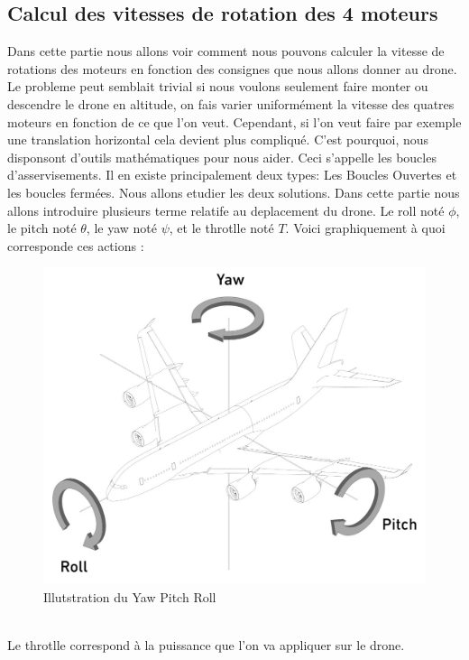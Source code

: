 \documentclass[10pt,a4paper]{article}
\begin{document}
\subsection{Calcul des vitesses de rotation des 4 moteurs}
Dans cette partie nous allons voir comment nous pouvons calculer la vitesse de rotations des moteurs en fonction des consignes que nous allons donner au drone. Le probleme peut semblait trivial si nous voulons seulement faire monter ou descendre le drone en altitude, on fais varier uniformément la vitesse des quatres moteurs en fonction de ce que l'on veut. Cependant, si l'on veut faire par exemple une translation horizontal cela devient plus compliqué. C'est pourquoi, nous disponsont d'outils mathématiques pour nous aider. Ceci s'appelle les boucles d'asservisements. Il en existe principalement deux types: Les Boucles Ouvertes et les boucles fermées. Nous allons etudier les deux solutions.
Dans cette partie nous allons introduire plusieurs terme relatife au deplacement du drone. Le roll noté $\phi$, le pitch noté $\theta$, le yaw noté  $\psi $, et le throtlle noté $T$. Voici graphiquement à quoi corresponde ces actions :
 \begin{figure}[h!]
\centering
\includegraphics[scale=0.250]{image/yawpitchroll.jpg}
\caption{Illutstration du Yaw Pitch Roll }
\label{fig:net }
\end{figure}\\
Le throtlle correspond à la puissance que l'on va appliquer sur le drone.
\end{document}
